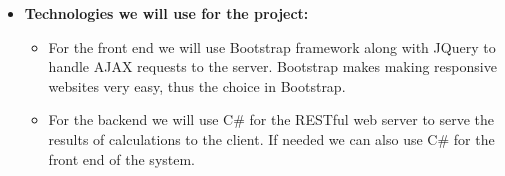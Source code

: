 \documentclass{article}
\begin{document}
\begin{itemize}
		\item \textbf{Technologies we will use for the project:}
		\begin{itemize}
			\item For the front end we will use Bootstrap framework along with JQuery to handle AJAX requests to the server. Bootstrap makes making responsive websites very easy, thus the choice in Bootstrap.
			\item For the backend we will use C\# for the RESTful web server to serve the results of calculations to the client. If needed we can also use C\# for the front end of the system.	
		\end{itemize}
	\end{itemize}
\end{document}
